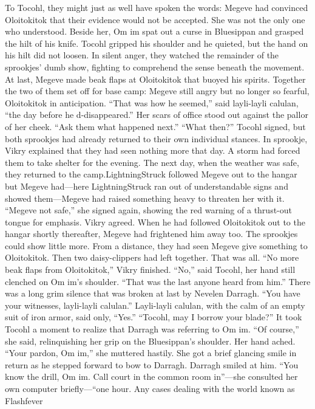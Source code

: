 \documentclass[9pt]{article}
\begin{document}
To Tocohl, they might just as well have spoken the words: Megeve had convinced Oloitokitok that
their evidence would not be accepted.
She was not the only one who understood. Beside her, Om im spat out a curse in Bluesippan and
grasped the hilt of his knife. Tocohl gripped his shoulder and he quieted, but the hand on his hilt did not
loosen.
In silent anger, they watched the remainder of the sprookjes’ dumb show, fighting to comprehend the
sense beneath the movement.
At last, Megeve made beak flaps at Oloitokitok that buoyed his spirits. Together the two of them set
off for base camp: Megeve still angry but no longer so fearful, Oloitokitok in anticipation.
“That was how he seemed,” said layli-layli calulan, “the day before he d-disappeared.” Her scars
of office stood out against the pallor of her cheek. “Ask them what happened next.”
“What then?” Tocohl signed, but both sprookjes had already returned to their own individual stances.
In sprookje, Vikry explained that they had seen nothing more that day. A storm had forced them to
take shelter for the evening. The next day, when the weather was safe, they returned to the camp.LightningStruck followed Megeve out to the hangar but Megeve had—here LightningStruck ran out of
understandable signs and showed them—Megeve had raised something heavy to threaten her with it.
“Megeve not safe,” she signed again, showing the red warning of a thrust-out tongue for emphasis.
Vikry agreed. When he had followed Oloitokitok out to the hangar shortly thereafter, Megeve had
frightened him away too.
The sprookjes could show little more. From a distance, they had seen Megeve give something to
Oloitokitok. Then two daisy-clippers had left together. That was all.
“No more beak flaps from Oloitokitok,” Vikry finished.
“No,” said Tocohl, her hand still clenched on Om im’s shoulder. “That was the last anyone heard
from him.”
There was a long grim silence that was broken at last by Nevelen Darragh. “You have your
witnesses, layli-layli calulan.”
Layli-layli calulan, with the calm of an empty suit of iron armor, said only, “Yes.”
“Tocohl, may I borrow your blade?”
It took Tocohl a moment to realize that Darragh was referring to Om im. “Of course,” she said,
relinquishing her grip on the Bluesippan’s shoulder. Her hand ached. “Your pardon, Om im,” she
muttered hastily. She got a brief glancing smile in return as he stepped forward to bow to Darragh.
Darragh smiled at him. “You know the drill, Om im. Call court in the common room in”—she
consulted her own computer briefly—“one hour. Any cases dealing with the world known as Flashfever
\end{document}
